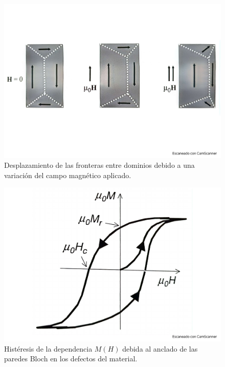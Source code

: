 \begin{figure}[h!] \centering
	\includegraphics[scale=0.35]{Cuerpo/Ch_10/Fotos libro 8.pdf}
	\caption{Desplazamiento de las fronteras entre dominios debido a una variación del campo magnético aplicado.}
	\label{Fig:10-08}
\end{figure}
\begin{figure}[h!] \centering
	\includegraphics[scale=0.35]{Cuerpo/Ch_10/Fotos libro 9.pdf}
	\caption{Histéresis de la dependencia $M(H)$ debida al anclado de las paredes Bloch en los defectos del material.}
	\label{Fig:10-09}
\end{figure}